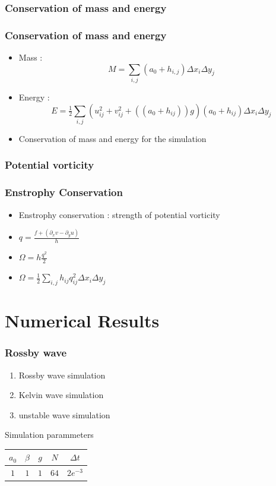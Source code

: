 \documentclass[numbering=fraction]{beamer}
\begin{document}
\subsubsection{Conservation of mass and energy}
\begin{frame}
    \frametitle{Conservation of mass and energy}
    \begin{itemize}
        \item Mass :     $$M = \sum_{i,j} (a_0 + h_{i,j})\Delta x_i \Delta y_j$$
        \item Energy :     $$E = \tfrac{1}{2}\sum_{i,j}(u_{ij}^2 + v_{ij}^2 + ((a_0 + h_{ij}))g) (a_0 + h_{ij}) \Delta x_i \Delta y_j$$
        \item Conservation of mass and energy for the simulation
    \end{itemize}
\end{frame}
\subsubsection{Potential vorticity}
\begin{frame}
    \frametitle{Enstrophy Conservation}
    \begin{itemize}
        \item Enstrophy conservation : strength of potential vorticity
        \item $q = \frac{f + (\partial_x v - \partial_y u)}{h}$
        \item     $\Omega = h \frac{q^2}{2}$
        \item     $\Omega = \tfrac{1}{2}\sum_{i,j}h_{ij}q_{ij}^2\Delta x_i\Delta y_j  $
    \end{itemize}
\end{frame}
\section{Numerical Results}
\begin{frame}
    \frametitle{Rossby wave}
    \begin{minipage}{.48\linewidth}
        \begin{enumerate}
            \item Rossby wave simulation
            \item Kelvin wave simulation
            \item unstable wave simulation
        \end{enumerate}
    \end{minipage}
    \begin{minipage}{.48\linewidth}
        \begin{center}
            Simulation parammeters
            \begin{tabular}{|c||c||c||c||c|}
                \hline
                $a_0$ & $\beta$ & $g$ & $N$  & $\Delta t$ \\
                \hline
                $1$   & $1$     & $1$ & $64$ & $2e^{-3}$  \\
                \hline
            \end{tabular}
        \end{center}
    \end{minipage}
\end{frame}
\end{document}
